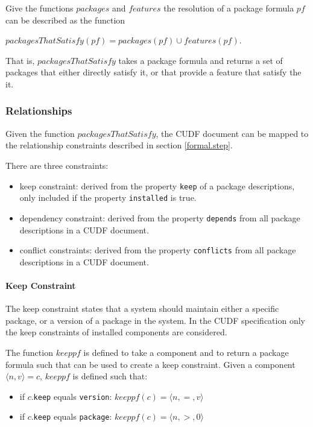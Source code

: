 Give the functions $packages$ and $features$ the resolution of a package formula $pf$ can be described as the function 
\begin{defs}
$packagesThatSatisfy(pf) = packages(pf) \cup features(pf)$.
\end{defs}
That is, $packagesThatSatisfy$ takes a package formula and returns a set of packages that either directly satisfy it, or that provide a feature that satisfy the it.

\subsubsection{Relationships}
Given the function $packagesThatSatisfy$, the CUDF document can be mapped to the relationship constraints described in section \ref{formal.step}.

There are three constraints:
\begin{itemize}
  \item keep constraint: derived from the property \verb+keep+ of a package descriptions, only included if the property \verb+installed+ is true.
  \item dependency constraint: derived from the property \verb+depends+ from all package descriptions in a CUDF document.
  \item conflict constraints: derived from the property \verb+conflicts+ from all package descriptions in a CUDF document.
\end{itemize}

\paragraph{Keep Constraint}
The keep constraint states that a system should maintain either a specific package, or a version of a package in the system.
In the CUDF specification only the keep constraints of installed components are considered.

The function $keeppf$ is defined to take a component and to return a package formula such that can be used to create a keep constraint.
Given a component $\langle n,v \rangle = c$, $keeppf$ is defined such that:
\begin{itemize}
	\item if $c$.\verb+keep+ equals \verb+version+: $keeppf(c) = \langle n, =, v \rangle$
	\item if $c$.\verb+keep+ equals \verb+package+: $keeppf(c) = \langle n, >, 0 \rangle$
\end{itemize}

